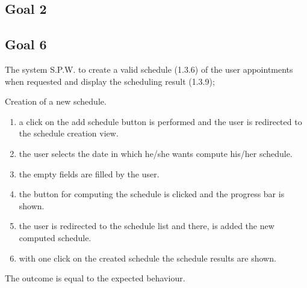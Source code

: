 

\subsection{Goal 2}

\subsection{Goal 6}

The system S.P.W. to create a valid schedule (1.3.6) of the user appointments when
requested and display the scheduling result (1.3.9);

{Creation of a new schedule.}
{{\begin{enumerate}
\item a click on the add schedule button is performed and the user is redirected to the schedule creation view.
\item the user selects the date in which he/she wants compute his/her schedule.
\item the empty fields are filled by the user.
\item the button for computing the schedule is clicked and the progress bar is shown.
\item the user is redirected to the schedule list and there, is added the new computed schedule.
\item with one click on the created schedule the schedule results are shown.
\end{enumerate}}}
{The outcome is equal to the expected behaviour.}







